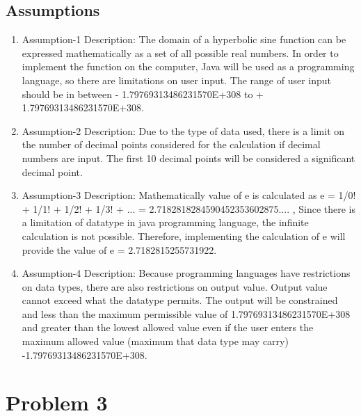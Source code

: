 \documentclass[
	12pt
]{article}
\begin{document}
\subsection{Assumptions}
\begin{enumerate}
    \item 
    Assumption-1 \newline Description: The domain of a hyperbolic sine function can be expressed mathematically as a set of all possible real numbers. In order to implement the function on the computer, Java will be used as a programming language, so there are limitations on user input. The range of user input should be in between - 1.79769313486231570E+308 to + 1.79769313486231570E+308.

    \item
    Assumption-2 \newline Description: Due to the type of data used, there is a limit on the number of decimal points considered for the calculation if decimal numbers are input. The first 10 decimal points will be considered a significant decimal point.

    \item
    Assumption-3 \newline Description: Mathematically value of e is calculated as\newline
    e = 1/0! + 1/1! + 1/2! + 1/3! + ... = 2.7182818284590452353602875.... , Since there is a limitation of datatype in java programming language, the infinite calculation is not possible\cite{hyperbolicfunctions}. Therefore, implementing the calculation of e will provide the value of e = 2.7182815255731922.
    \item
     Assumption-4 \newline Description: Because programming languages have restrictions on data types, there are also restrictions on output value. Output value cannot exceed what the datatype permits. The output will be constrained and less than the maximum permissible value of 1.79769313486231570E+308 and greater than the lowest allowed value even if the user enters the maximum allowed value (maximum that data type may carry) -1.79769313486231570E+308\cite{range}.
\end{enumerate}

\section{Problem 3}
\end{document}
